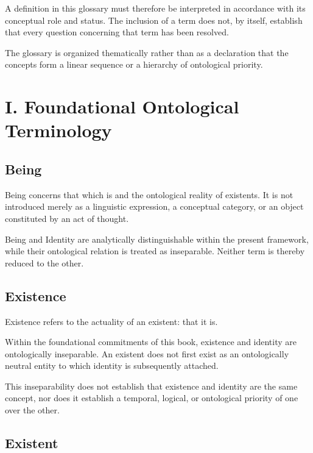 A definition in this glossary must therefore be interpreted in accordance
with its conceptual role and status. The inclusion of a term does not,
by itself, establish that every question concerning that term has been
resolved.

The glossary is organized thematically rather than as a declaration that
the concepts form a linear sequence or a hierarchy of ontological priority.



\section*{I. Foundational Ontological Terminology}


\subsection*{Being}

Being concerns that which is and the ontological reality of existents.
It is not introduced merely as a linguistic expression, a conceptual
category, or an object constituted by an act of thought.

Being and Identity are analytically distinguishable within the present
framework, while their ontological relation is treated as inseparable.
Neither term is thereby reduced to the other.


\subsection*{Existence}

Existence refers to the actuality of an existent: that it is.

Within the foundational commitments of this book, existence and identity
are ontologically inseparable. An existent does not first exist as an
ontologically neutral entity to which identity is subsequently attached.

This inseparability does not establish that existence and identity are
the same concept, nor does it establish a temporal, logical, or
ontological priority of one over the other.


\subsection*{Existent}

